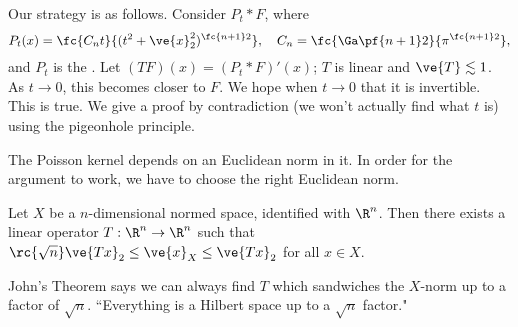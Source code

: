 
Our strategy is as follows. Consider $P_t*F$, where 
\[
P_t(x)=\fc{C_nt}{(t^2+\ve{x}_2^2)^{\fc{n+1}2}}, \quad C_n=\fc{\Ga\pf{n+1}2}{\pi^{\fc{n+1}2}},
\]
and $P_t$ is the . 
Let $(TF)(x)=(P_t*F)'(x)$; $T$ is linear and $\ve{T}\lesssim 1$. As $t\to 0$, this becomes closer to $F$. We hope when $t\to 0$ that it is invertible. This is true. We give a proof by contradiction (we won't actually find what $t$ is) using the pigeonhole principle. %

The Poisson kernel depends on an Euclidean norm in it. 
In order for the argument to work, we have to choose the right Euclidean norm.

\begin{thm}
Let $X$ be a $n$-dimensional normed space, identified with $\R^n$. Then there exists a linear operator $T:\R^n\to \R^n$ such that $\rc{\sqrt{n}}\ve{Tx}_2\le \ve{x}_X \le \ve{Tx}_2$ for all $x\in X$.
\end{thm}
John's Theorem says we can always find $T$ which sandwiches the $X$-norm up to a factor of $\sqrt n$. 
``Everything is a Hilbert space up to a $\sqrt n$ factor."

